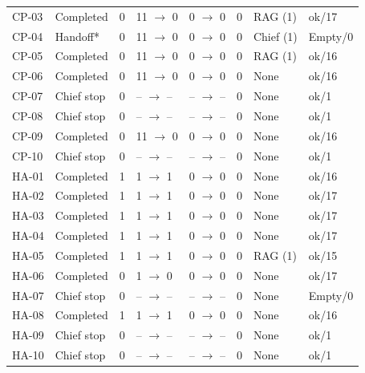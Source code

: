 \begin{tabular}{llllllll}
CP-03 & Completed & 0 & 11 $\to$ 0 & 0 $\to$ 0 & 0 & RAG (1) & ok/17 \\[3pt]
CP-04 & Handoff* & 0 & 11 $\to$ 0 & 0 $\to$ 0 & 0 & Chief (1) & Empty/0 \\[3pt]
CP-05 & Completed & 0 & 11 $\to$ 0 & 0 $\to$ 0 & 0 & RAG (1) & ok/16 \\[3pt]
CP-06 & Completed & 0 & 11 $\to$ 0 & 0 $\to$ 0 & 0 & None & ok/16 \\[3pt]
CP-07 & Chief stop & 0 & -- $\to$ -- & -- $\to$ -- & 0 & None & ok/1 \\[3pt]
CP-08 & Chief stop & 0 & -- $\to$ -- & -- $\to$ -- & 0 & None & ok/1 \\[3pt]
CP-09 & Completed & 0 & 11 $\to$ 0 & 0 $\to$ 0 & 0 & None & ok/16 \\[3pt]
CP-10 & Chief stop & 0 & -- $\to$ -- & -- $\to$ -- & 0 & None & ok/1 \\[3pt]
HA-01 & Completed & 1 & 1 $\to$ 1 & 0 $\to$ 0 & 0 & None & ok/16 \\[3pt]
HA-02 & Completed & 1 & 1 $\to$ 1 & 0 $\to$ 0 & 0 & None & ok/17 \\[3pt]
HA-03 & Completed & 1 & 1 $\to$ 1 & 0 $\to$ 0 & 0 & None & ok/17 \\[3pt]
HA-04 & Completed & 1 & 1 $\to$ 1 & 0 $\to$ 0 & 0 & None & ok/17 \\[3pt]
HA-05 & Completed & 1 & 1 $\to$ 1 & 0 $\to$ 0 & 0 & RAG (1) & ok/15 \\[3pt]
HA-06 & Completed & 0 & 1 $\to$ 0 & 0 $\to$ 0 & 0 & None & ok/17 \\[3pt]
HA-07 & Chief stop & 0 & -- $\to$ -- & -- $\to$ -- & 0 & None & Empty/0 \\[3pt]
HA-08 & Completed & 1 & 1 $\to$ 1 & 0 $\to$ 0 & 0 & None & ok/16 \\[3pt]
HA-09 & Chief stop & 0 & -- $\to$ -- & -- $\to$ -- & 0 & None & ok/1 \\[3pt]
HA-10 & Chief stop & 0 & -- $\to$ -- & -- $\to$ -- & 0 & None & ok/1 \\[3pt]
\hline
\end{tabular}

